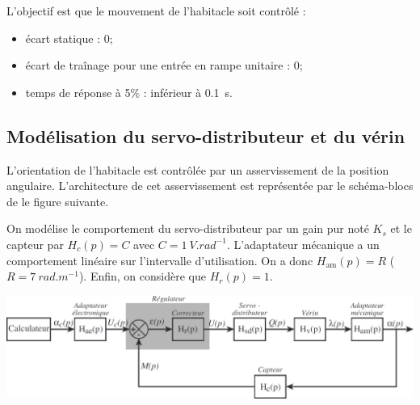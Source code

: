 \begin{multicols}{2}
\begin{multicols}{2}
\begin{obj}
L'objectif est que le mouvement de l'habitacle soit contrôlé :
\begin{itemize}
\item écart statique : 0\degres;
\item écart de traînage pour une entrée en rampe unitaire : 0\degres;
\item temps de réponse à 5\% : inférieur à \SI{0,1}{s}.

\end{itemize}
\end{obj}

\subsection*{Modélisation du servo-distributeur et du vérin}

L'orientation de l'habitacle est contrôlée par un asservissement de la position angulaire. L'architecture de cet asservissement est représentée par le schéma-blocs de le figure suivante.

On modélise le comportement du servo-distributeur par un gain pur noté $K_s$ et le capteur par $H_c(p)=C$ avec $C=\SI{1}{V.rad^{-1}}$.  L'adaptateur mécanique a un comportement linéaire sur l'intervalle d'utilisation. On a donc $H_{\text{am}}(p)=R$ ($R=\SI{7}{rad.m^{-1}}$). Enfin, on considère que $H_r(p)=1$. 

\begin{center}
\includegraphics[width=\linewidth]{images/fig_05}
\end{center}


\end{multicols}
\end{multicols}
